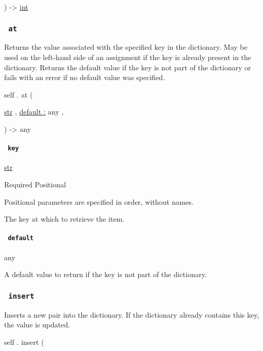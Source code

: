 ) -\textgreater{} \href{/docs/reference/foundations/int/}{int}

\subsubsection{\texorpdfstring{\texttt{\ at\ }}{ at }}\label{definitions-at}

Returns the value associated with the specified key in the dictionary.
May be used on the left-hand side of an assignment if the key is already
present in the dictionary. Returns the default value if the key is not
part of the dictionary or fails with an error if no default value was
specified.

self { . } { at } (

{ \href{/docs/reference/foundations/str/}{str} , } {
\hyperref[definitions-at-parameters-default]{default :} { any } , }

) -\textgreater{} { any }

\paragraph{\texorpdfstring{\texttt{\ key\ }}{ key }}\label{definitions-at-key}

\href{/docs/reference/foundations/str/}{str}

{Required} {{ Positional }}

\label{definitions-at-key-positional-tooltip}
Positional parameters are specified in order, without names.

The key at which to retrieve the item.

\paragraph{\texorpdfstring{\texttt{\ default\ }}{ default }}\label{definitions-at-default}

{ any }

A default value to return if the key is not part of the dictionary.

\subsubsection{\texorpdfstring{\texttt{\ insert\ }}{ insert }}\label{definitions-insert}

Inserts a new pair into the dictionary. If the dictionary already
contains this key, the value is updated.

self { . } { insert } (

